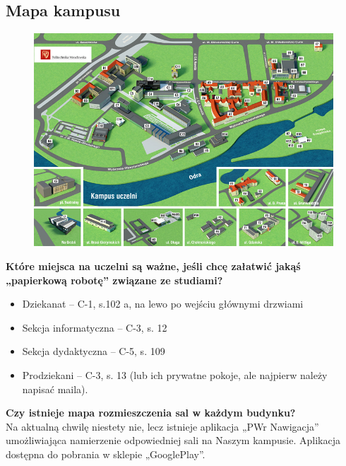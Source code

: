 \documentclass[11pt]{article}
\begin{document}
\subsection{Mapa kampusu}
\begin{figure}[H]
    \centering
    \includegraphics[width=\linewidth]{mapa.png}
\end{figure}





\textbf{Które miejsca na uczelni są ważne, jeśli chcę załatwić jakąś „papierkową robotę” związane ze studiami?}
\begin{itemize}
\item Dziekanat – C-1, s.102 a, na lewo po wejściu głównymi drzwiami
\item Sekcja informatyczna – C-3, s. 12
\item Sekcja dydaktyczna – C-5, s. 109
\item Prodziekani – C-3, s. 13 (lub ich prywatne pokoje, ale najpierw należy napisać maila).
\end{itemize}
\textbf{Czy istnieje mapa rozmieszczenia sal w każdym budynku?}\\
\indent Na aktualną chwilę niestety nie, lecz istnieje aplikacja „PWr Nawigacja” umożliwiająca namierzenie odpowiedniej sali na Naszym kampusie. Aplikacja dostępna do pobrania w sklepie „GooglePlay”.

\newpage
\end{document}
